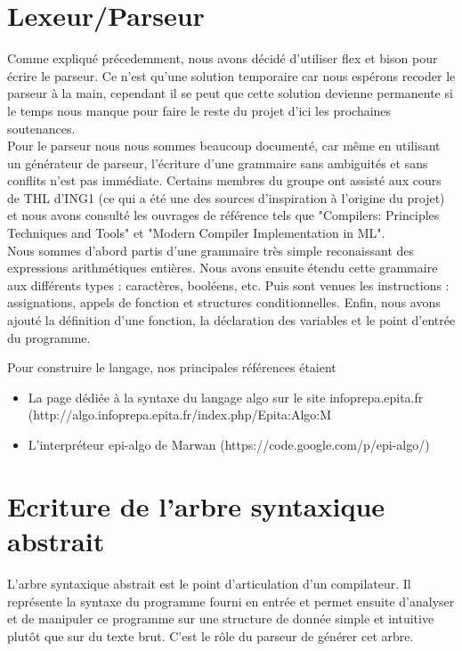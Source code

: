 \documentclass[12pt,a4paper]{report}
\begin{document}
\newpage

\section{Lexeur/Parseur}
Comme expliqué précedemment, nous avons décidé d'utiliser flex et bison pour écrire le parseur. Ce n'est qu'une solution temporaire car nous espérons recoder le parseur à la main, cependant il se peut que cette solution devienne permanente si le temps nous manque pour faire le reste du projet d'ici les prochaines soutenances. \\

Pour le parseur nous nous sommes beaucoup documenté, car même en utilisant un générateur de parseur, l'écriture d'une grammaire sans ambiguités et sans conflits n'est pas immédiate. Certains membres du groupe ont assisté aux cours de THL d'ING1 (ce qui a été une des sources d'inspiration à l'origine du projet) et nous avons consulté les ouvrages de référence tels que "Compilers: Principles Techniques and Tools" et "Modern Compiler Implementation in ML". \\

Nous sommes d'abord partis d'une grammaire très simple reconaissant des expressions arithmétiques entières. Nous avons ensuite étendu cette grammaire aux différents types : caractères, booléens, etc. Puis sont venues les instructions : assignations, appels de fonction et structures conditionnelles. Enfin, nous avons ajouté la définition d'une fonction, la déclaration des variables et le point d'entrée du programme.

Pour construire le langage, nos principales références étaient
\begin{itemize}
\item La page dédiée à la syntaxe du langage algo sur le site infoprepa.epita.fr (http://algo.infoprepa.epita.fr/index.php/Epita:Algo:M%
\item L'interpréteur epi-algo de Marwan (https://code.google.com/p/epi-algo/)
\end{itemize}

\newpage

\section{Ecriture de l'arbre syntaxique abstrait}
L'arbre syntaxique abstrait est le point d'articulation d'un compilateur. Il représente la syntaxe du programme fourni en entrée et permet ensuite d'analyser et de manipuler ce programme sur une structure de donnée simple et intuitive plutôt que sur du texte brut. C'est le rôle du parseur de générer cet arbre. \\
\end{document}
